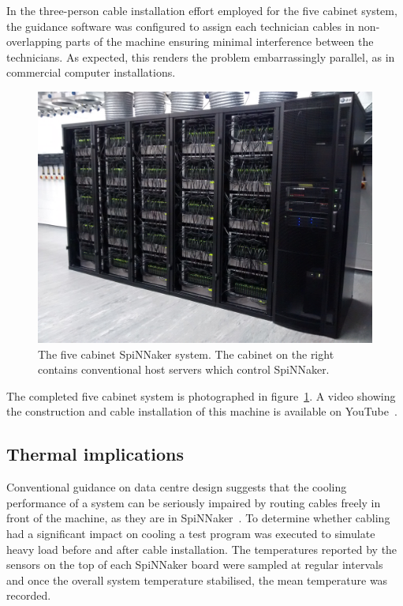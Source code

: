 			In the three-person cable installation effort employed for the five
			cabinet system, the guidance software was configured to assign each
			technician cables in non-overlapping parts of the machine ensuring
			minimal interference between the technicians. As expected, this renders
			the problem embarrassingly parallel, as in commercial computer
			installations.
			
			\begin{figure}
				\center
				\includegraphics[width=0.8\linewidth]{figures/halfMillionCoreComplete.jpg}
				
				\caption[The five cabinet SpiNNaker system.]%
				{The five cabinet SpiNNaker system. The cabinet on the right contains
				conventional host servers which control SpiNNaker.}
				\label{fig:halfMillionCoreComplete}
			\end{figure}
			
			The completed five cabinet system is photographed in
			figure~\ref{fig:halfMillionCoreComplete}. A video showing the
			construction and cable installation of this machine is available on
			YouTube~\cite{heathcote16}.
			
		\subsection{Thermal implications}
			
			Conventional guidance on data centre design suggests that the cooling
			performance of a system can be seriously impaired by routing cables
			freely in front of the machine, as they are in SpiNNaker~\cite{cisco07}.
			To determine whether cabling had a significant impact on cooling a test
			program was executed to simulate heavy load before and after cable
			installation.  The temperatures reported by the sensors on the top of
			each SpiNNaker board were sampled at regular intervals and once the
			overall system temperature stabilised, the mean temperature was recorded.
			
